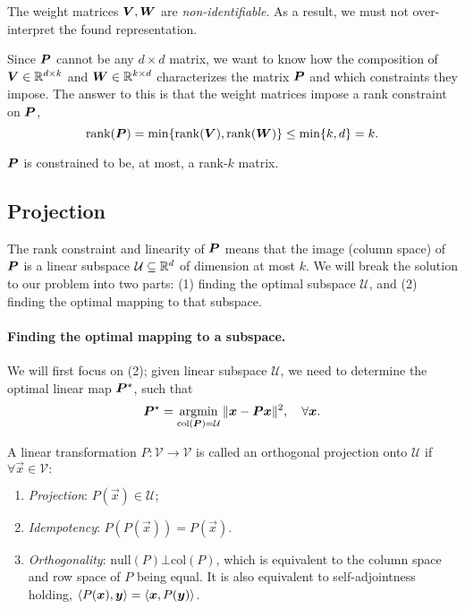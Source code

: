 \begin{important}
    The weight matrices $\bm{V}, \bm{W}$ are \textit{non-identifiable}. As a result, we must not over-interpret the found representation.
\end{important}

Since $\bm{P}$ cannot be any $d\times d$ matrix, we want to know how the composition of $\bm{V}
    \in \mathbb{R}^{d\times k}$ and $\bm{W} \in \mathbb{R}^{k\times d}$ characterizes the matrix $\bm{P}$ and which
constraints they impose. The answer to this is that the weight matrices impose a rank constraint on
$\bm{P}$, \[
    \mathrm{rank}(\bm{P}) = \min \{ \mathrm{rank}(\bm{V}), \mathrm{rank}(\bm{W}) \} \leq \min \{ k, d \} = k.
\]

\begin{important}
    $\bm{P}$ is constrained to be, at most, a rank-$k$ matrix.
\end{important}

\subsection{Projection}

The rank constraint and linearity of $\bm{P}$ means that the image (column space) of $\bm{P}$ is
a linear subspace $\mathcal{U} \subseteq \mathbb{R}^d$ of dimension at most $k$. We will break the solution
to our problem into two parts: (1) finding the optimal subspace $\mathcal{U}$, and (2) finding the
optimal mapping to that subspace.

\paragraph{Finding the optimal mapping to a subspace.}

We will first focus on (2); given linear subspace $\mathcal{U}$, we need to determine the optimal
linear map $\bm{P}^\star$, such that \[
    \bm{P}^\star = \operatorname*{argmin}_{\mathrm{col}(\bm{P}) = \mathcal{U}} \| \bm{x} - \bm{P}\bm{x} \|^2, \quad \forall \bm{x}.
\]

\begin{definition}
    \label{def:orthogonal-projection}

    A linear transformation $P: \mathcal{V} \to \mathcal{V}$ is called an orthogonal projection onto
    $\mathcal{U}$ if $\forall \vec{x}\in \mathcal{V}:$
    \begin{enumerate}
        \item \textit{Projection}: $P(\vec{x}) \in \mathcal{U}$;
        \item \textit{Idempotency}: $P(P(\vec{x})) = P(\vec{x})$.
        \item \textit{Orthogonality}: $\mathrm{null}(P) \bot \mathrm{col}(P)$, which is equivalent to the column space and row space of $P$ being equal.
              It is also equivalent to self-adjointness holding, $\langle P(\bm{x}), \bm{y} \rangle = \langle \bm{x},P(\bm{y}) \rangle$.
    \end{enumerate}
\end{definition}

